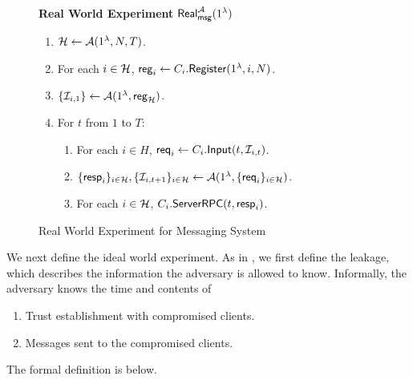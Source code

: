 \begin{figure}[!ht]
\begin{framed}
\textbf{Real World Experiment }$\mathsf{Real}_{\mathsf{msg}}^{\mathcal{A}}(1^{\lambda})$
\begin{enumerate}
\item $\mathcal{H} \leftarrow \mathcal{A}(1^{\lambda}, N, T)$.
\item For each $i \in \mathcal{H}$, $\mathsf{reg}_i \leftarrow C_i.\mathsf{Register}(1^{\lambda}, i, N)$. 
\item $\{\mathcal{I}_{i, 1}\} \leftarrow \mathcal{A}(1^{\lambda}, \mathsf{reg}_{\mathcal{H}})$.
\item For $t$ from $1$ to $T$:
    \begin{enumerate}
    \item For each $i \in H$, $\mathsf{req}_i \leftarrow C_i.\mathsf{Input}(t, \mathcal{I}_{i, t})$.
    
    \item $\{\mathsf{resp}_i\}_{i \in \mathcal{H}}, \{\mathcal{I}_{i, t + 1}\}_{i \in \mathcal{H}} \leftarrow \mathcal{A}(1^{\lambda}, \{\mathsf{req}_i\}_{i \in \mathcal{H}})$.
    
    \item For each $i \in \mathcal{H}$, $C_i.\mathsf{ServerRPC}(t, \mathsf{resp}_i)$.
    \end{enumerate}
\end{enumerate}
\end{framed}
\caption{Real World Experiment for Messaging System}
\label{expr:messaging-real-world}
\end{figure}

We next define the ideal world experiment. As in \cite{shi2021non}, we first define the leakage, which describes the information the adversary is allowed to know. Informally, the adversary knows the time and contents of
\begin{enumerate}
    \item Trust establishment with compromised clients.
    \item Messages sent to the compromised clients.
\end{enumerate}
The formal definition is below.


